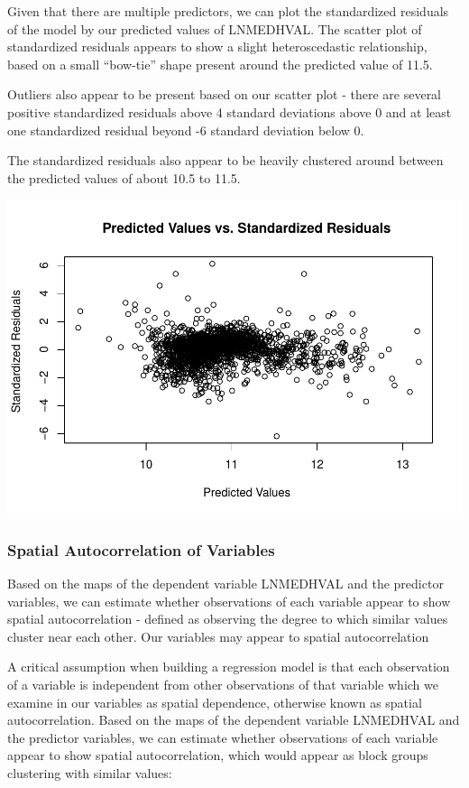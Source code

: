 \documentclass[
]{article}
\begin{document}
Given that there are multiple predictors, we can plot the standardized
residuals of the model by our predicted values of LNMEDHVAL. The scatter
plot of standardized residuals appears to show a slight heteroscedastic
relationship, based on a small ``bow-tie'' shape present around the
predicted value of 11.5.

Outliers also appear to be present based on our scatter plot - there are
several positive standardized residuals above 4 standard deviations
above 0 and at least one standardized residual beyond -6 standard
deviation below 0.

The standardized residuals also appear to be heavily clustered around
between the predicted values of about 10.5 to 11.5.

\includegraphics{HW1-Regression_files/figure-latex/plot_stand_resid-1.pdf}

\hypertarget{spatial-autocorrelation-of-variables}{%
\subsubsection{Spatial Autocorrelation of
Variables}\label{spatial-autocorrelation-of-variables}}

Based on the maps of the dependent variable LNMEDHVAL and the predictor
variables, we can estimate whether observations of each variable appear
to show spatial autocorrelation - defined as observing the degree to
which similar values cluster near each other. Our variables may appear
to spatial autocorrelation

A critical assumption when building a regression model is that each
observation of a variable is independent from other observations of that
variable which we examine in our variables as spatial dependence,
otherwise known as spatial autocorrelation. Based on the maps of the
dependent variable LNMEDHVAL and the predictor variables, we can
estimate whether observations of each variable appear to show spatial
autocorrelation, which would appear as block groups clustering with
similar values:
\end{document}
